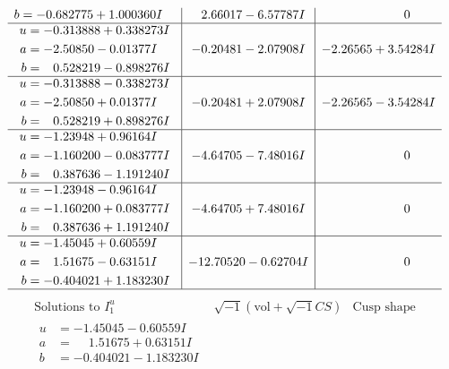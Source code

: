 \documentclass[1p]{elsarticle_modified}
\theoremstyle{definition}
\newcommand{\I}{\sqrt{-1}}
\begin{document}
$$\begin{array}{c|c|c}
\begin{aligned}
b &= -0.682775 + 1.000360 I\end{aligned}
 & \phantom{-}2.66017 - 6.57787 I & \phantom{-0.000000 } 0 \\ \hline\begin{aligned}
u &= -0.313888 + 0.338273 I \\
a &= -2.50850 - 0.01377 I \\
b &= \phantom{-}0.528219 - 0.898276 I\end{aligned}
 & -0.20481 - 2.07908 I & -2.26565 + 3.54284 I \\ \hline\begin{aligned}
u &= -0.313888 - 0.338273 I \\
a &= -2.50850 + 0.01377 I \\
b &= \phantom{-}0.528219 + 0.898276 I\end{aligned}
 & -0.20481 + 2.07908 I & -2.26565 - 3.54284 I \\ \hline\begin{aligned}
u &= -1.23948 + 0.96164 I \\
a &= -1.160200 - 0.083777 I \\
b &= \phantom{-}0.387636 - 1.191240 I\end{aligned}
 & -4.64705 - 7.48016 I & \phantom{-0.000000 } 0 \\ \hline\begin{aligned}
u &= -1.23948 - 0.96164 I \\
a &= -1.160200 + 0.083777 I \\
b &= \phantom{-}0.387636 + 1.191240 I\end{aligned}
 & -4.64705 + 7.48016 I & \phantom{-0.000000 } 0 \\ \hline\begin{aligned}
u &= -1.45045 + 0.60559 I \\
a &= \phantom{-}1.51675 - 0.63151 I \\
b &= -0.404021 + 1.183230 I\end{aligned}
 & -12.70520 - 0.62704 I & \phantom{-0.000000 } 0\\
 \hline 
 \end{array}$$\newpage$$\begin{array}{c|c|c}  
\text{Solutions to }I^u_{1}& \I (\text{vol} + \sqrt{-1}CS) & \text{Cusp shape}\\
 \hline 
\begin{aligned}
u &= -1.45045 - 0.60559 I \\
a &= \phantom{-}1.51675 + 0.63151 I \\
b &= -0.404021 - 1.183230 I\end{aligned}

\end{array}$$
\end{document}
